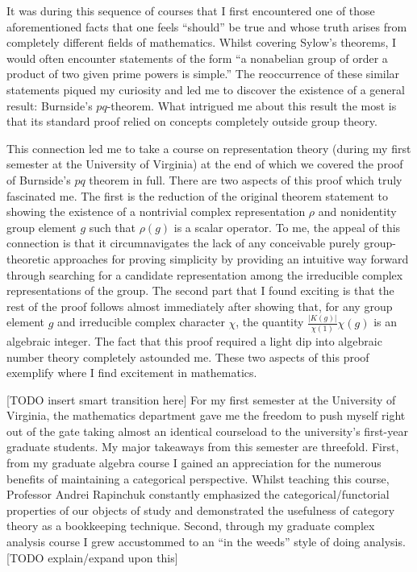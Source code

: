 \documentclass[12pt]{article}
\begin{document}
It was during this sequence of courses that I first encountered one of those aforementioned facts that one feels ``should'' be true and whose truth arises from completely different fields of mathematics. Whilst covering Sylow's theorems, I would often encounter statements of the form ``a nonabelian group of order a product of two given prime powers is simple.'' The reoccurrence of these similar statements piqued my curiosity and led me to discover the existence of a general result: Burnside's $pq$-theorem. What intrigued me about this result the most is that its standard proof relied on concepts completely outside group theory.

This connection led me to take a course on representation theory (during my first semester at the University of Virginia) at the end of which we covered the proof of Burnside's $pq$ theorem in full. There are two aspects of this proof which truly fascinated me. The first is the reduction of the original theorem statement to showing the existence of a nontrivial complex representation $\rho$ and nonidentity group element $g$ such that $\rho(g)$ is a scalar operator. To me, the appeal of this connection is that it circumnavigates the lack of any conceivable purely group-theoretic approaches for proving simplicity by providing an intuitive way forward through searching for a candidate representation among the irreducible complex representations of the group. The second part that I found exciting is that the rest of the proof follows almost immediately after showing that, for any group element $g$ and irreducible complex character $\chi$, the quantity $\frac{|K(g)|}{\chi(1)}\chi(g)$ is an algebraic integer. The fact that this proof required a light dip into algebraic number theory completely astounded me. These two aspects of this proof exemplify where I find excitement in mathematics. 




[TODO insert smart transition here] For my first semester at the University of Virginia, the mathematics department gave me the freedom to push myself right out of the gate taking almost an identical courseload to the university's first-year graduate students. My major takeaways from this semester are threefold. First, from my graduate algebra course I gained an appreciation for the numerous benefits of maintaining a categorical perspective.
Whilst teaching this course, Professor Andrei Rapinchuk constantly emphasized the categorical/functorial properties of our objects of study and demonstrated the usefulness of category theory as a bookkeeping technique. Second, through my graduate complex analysis course I grew accustommed to an ``in the weeds'' style of doing analysis. [TODO explain/expand upon this]
\end{document}
